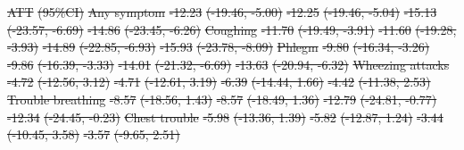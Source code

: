\documentclass[
  letterpaper,
  DIV=11,
  numbers=noendperiod]{scrartcl}
\makeatletter
\renewenvironment{table}%
   {\renewcommand\familydefault\sfdefault
    \@float{table}}
   {\end@float}
\providecommand{\DIFdeltex}[1]{{\protect\color{red}\sout{#1}}}                      %
\providecommand{\DIFdelFL}[1]{\DIFdel{#1}} %
\providecommand{\DIFdel}[1]{\texorpdfstring{\DIFdeltex{#1}}{}} %
\makeatother
\begin{document}
\begin{table}
\DIFdelFL{ATT }%
\DIFdelFL{(95\%CI)}%
\DIFdelFL{Any symptom }%
\DIFdelFL{-12.23 }%
\DIFdelFL{(-19.46, -5.00) }%
\DIFdelFL{-12.25 }%
\DIFdelFL{(-19.46, -5.04) }%
\DIFdelFL{-15.13 }%
\DIFdelFL{(-23.57, -6.69) }%
\DIFdelFL{-14.86 }%
\DIFdelFL{(-23.45, -6.26)}%
\DIFdelFL{Coughing }%
\DIFdelFL{-11.70 }%
\DIFdelFL{(-19.49, -3.91) }%
\DIFdelFL{-11.60 }%
\DIFdelFL{(-19.28, -3.93) }%
\DIFdelFL{-14.89 }%
\DIFdelFL{(-22.85, -6.93) }%
\DIFdelFL{-15.93 }%
\DIFdelFL{(-23.78, -8.09)}%
\DIFdelFL{Phlegm }%
\DIFdelFL{-9.80 }%
\DIFdelFL{(-16.34, -3.26) }%
\DIFdelFL{-9.86 }%
\DIFdelFL{(-16.39, -3.33) }%
\DIFdelFL{-14.01 }%
\DIFdelFL{(-21.32, -6.69) }%
\DIFdelFL{-13.63 }%
\DIFdelFL{(-20.94, -6.32)}%
\DIFdelFL{Wheezing attacks }%
\DIFdelFL{-4.72 }%
\DIFdelFL{(-12.56, 3.12) }%
\DIFdelFL{-4.71 }%
\DIFdelFL{(-12.61, 3.19) }%
\DIFdelFL{-6.39 }%
\DIFdelFL{(-14.44, 1.66) }%
\DIFdelFL{-4.42 }%
\DIFdelFL{(-11.38, 2.53)}%
\DIFdelFL{Trouble breathing }%
\DIFdelFL{-8.57 }%
\DIFdelFL{(-18.56, 1.43) }%
\DIFdelFL{-8.57 }%
\DIFdelFL{(-18.49, 1.36) }%
\DIFdelFL{-12.79 }%
\DIFdelFL{(-24.81, -0.77) }%
\DIFdelFL{-12.34 }%
\DIFdelFL{(-24.45, -0.23)}%
\DIFdelFL{Chest trouble }%
\DIFdelFL{-5.98 }%
\DIFdelFL{(-13.36, 1.39) }%
\DIFdelFL{-5.82 }%
\DIFdelFL{(-12.87, 1.24) }%
\DIFdelFL{-3.44 }%
\DIFdelFL{(-10.45, 3.58) }%
\DIFdelFL{-3.57 }%
\DIFdelFL{(-9.65, 2.51)}%

\end{table}
\end{document}
